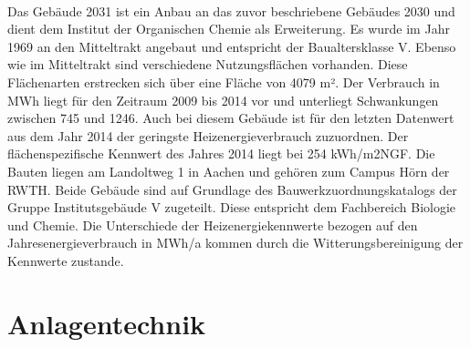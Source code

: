 \\
Das Gebäude 2031 ist ein Anbau an das zuvor beschriebene Gebäudes 2030 und dient dem Institut der Organischen Chemie als Erweiterung. Es wurde im Jahr 1969 an den Mitteltrakt angebaut und entspricht der Baualtersklasse V. Ebenso wie im Mitteltrakt sind verschiedene Nutzungsflächen vorhanden. Diese Flächenarten erstrecken sich über eine Fläche von 4079 m². Der Verbrauch in MWh liegt für den Zeitraum 2009 bis 2014 vor und unterliegt Schwankungen zwischen 745 und 1246. Auch bei diesem Gebäude ist für den letzten Datenwert aus dem Jahr 2014 der geringste Heizenergieverbrauch zuzuordnen. Der flächenspezifische Kennwert des Jahres 2014 liegt bei 254 kWh/m2NGF. 
Die Bauten liegen am Landoltweg 1 in Aachen und gehören zum Campus Hörn der RWTH. Beide Gebäude sind auf Grundlage des Bauwerkzuordnungskatalogs der Gruppe Institutsgebäude V zugeteilt. Diese entspricht dem Fachbereich Biologie und Chemie. 
Die Unterschiede der Heizenergiekennwerte bezogen auf den Jahresenergieverbrauch in MWh/a kommen durch die Witterungsbereinigung der Kennwerte zustande.

\section{Anlagentechnik}
\label{sec:Anlagentechnik}
 
